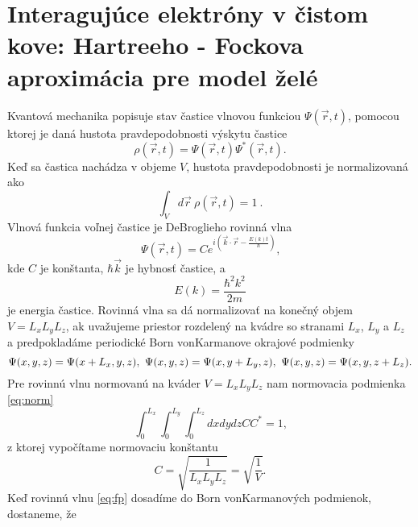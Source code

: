 \section{Interagujúce elektróny v čistom kove: Hartreeho - Fockova aproximácia pre model želé}
\label{sec:free_electrons}

Kvantová mechanika popisuje stav častice vlnovou funkciou $\Psi(\vec r,t)$, pomocou ktorej
je daná hustota pravdepodobnosti výskytu častice
\begin{equation}
\label{eq:fp2}
 \rho(\vec r, t)=\Psi(\vec r, t)\Psi^\ast(\vec r, t)\text{.}
\end{equation}
Keď sa častica nachádza v objeme $V$, hustota pravdepodobnosti je normalizovaná ako
\begin{equation}
\label{eq:norm}
 \int_{V} d \vec r  \  \rho(\vec r,t) = 1 \ .
\end{equation}
Vlnová funkcia voľnej častice je DeBroglieho rovinná vlna
\begin{equation}
\label{eq:fp}
 \Psi(\vec r,t)=Ce^{i(\vec k\cdot\vec r-\frac{E(k)t}{\hbar})} \text{,}
\end{equation}
kde $C$ je konštanta, $\hbar \vec k$ je hybnosť častice, a
\begin{equation}
 \label{eq:fp_erg}
 E(k)=\frac{\hbar^2 k^2}{2 m} \text{}
\end{equation}
je energia častice. Rovinná vlna sa dá normalizovať na konečný objem $V = L_xL_yL_z$,
ak uvažujeme priestor rozdelený na kvádre so stranami $L_x$, $L_y$ a $L_z$ a predpokladáme 
periodické Born vonKarmanove okrajové podmienky
\begin{equation}
 \Psi(x,y,z)=\Psi(x+L_x,y,z)\\, \\\ \Psi(x,y,z)=\Psi(x,y+L_y,z)\\, \\\ \Psi(x,y,z)=\Psi(x,y,z+L_z) \text{.}
\end{equation}
Pre rovinnú vlnu normovanú na kváder $V = L_xL_yL_z$ nam normovacia podmienka \eqref{eq:norm}
\begin{equation}
\label{eq:norm_bvk}
 \int_{0}^{L_x}  \int_{0}^{L_y}  \int_{0}^{L_z} dx dy dz  CC^\ast = 1\text{,}
\end{equation}
z ktorej vypočítame normovaciu konštantu
\begin{equation}
 \label{eq:A}
 C=\sqrt{\frac{1}{L_xL_yL_z}} = \sqrt{\frac{1}{V}} \text{.}
\end{equation}
Keď rovinnú vlnu \eqref{eq:fp} dosadíme do Born vonKarmanových podmienok, dostaneme, že
